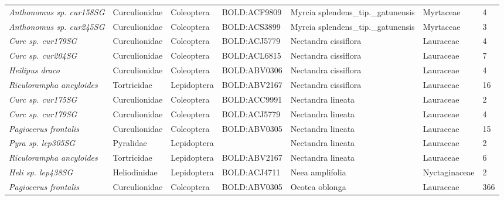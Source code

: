 \documentclass[11pt]{article}
\begin{document}
\begin{landscape}
\begin{longtable}{@{}lllllll@{}}
\textit{Anthonomus sp. cur158SG}                      & Curculionidae   & Coleoptera   & BOLD:ACF9809 & Myrcia splendens\_tip.\_gatunensis & Myrtaceae        & 4     \\
\textit{Anthonomus sp. cur245SG}                      & Curculionidae   & Coleoptera   & BOLD:ACS3899 & Myrcia splendens\_tip.\_gatunensis & Myrtaceae        & 3     \\
\textit{Curc sp. cur179SG}                            & Curculionidae   & Coleoptera   & BOLD:ACJ5779 & Nectandra cissiflora               & Lauraceae        & 4     \\
\textit{Curc sp. cur204SG}                            & Curculionidae   & Coleoptera   & BOLD:ACL6815 & Nectandra cissiflora               & Lauraceae        & 7     \\
\textit{Heilipus draco}                               & Curculionidae   & Coleoptera   & BOLD:ABV0306 & Nectandra cissiflora               & Lauraceae        & 4     \\
\textit{Riculorampha ancyloides}                      & Tortricidae     & Lepidoptera  & BOLD:ABV2167 & Nectandra cissiflora               & Lauraceae        & 16    \\
\textit{Curc sp. cur175SG}                            & Curculionidae   & Coleoptera   & BOLD:ACC9991 & Nectandra lineata                  & Lauraceae        & 2     \\
\textit{Curc sp. cur179SG}                            & Curculionidae   & Coleoptera   & BOLD:ACJ5779 & Nectandra lineata                  & Lauraceae        & 4     \\
\textit{Pagiocerus frontalis}                         & Curculionidae   & Coleoptera   & BOLD:ABV0305 & Nectandra lineata                  & Lauraceae        & 15    \\
\textit{Pyra sp. lep305SG}                            & Pyralidae       & Lepidoptera  &              & Nectandra lineata                  & Lauraceae        & 2     \\
\textit{Riculorampha ancyloides}                      & Tortricidae     & Lepidoptera  & BOLD:ABV2167 & Nectandra lineata                  & Lauraceae        & 6     \\
\textit{Heli sp. lep438SG}                            & Heliodinidae    & Lepidoptera  & BOLD:ACJ4711 & Neea amplifolia                    & Nyctaginaceae    & 2     \\
\textit{Pagiocerus frontalis}                         & Curculionidae   & Coleoptera   & BOLD:ABV0305 & Ocotea oblonga                     & Lauraceae        & 366   \\

\end{longtable}
\end{landscape}
\end{document}
